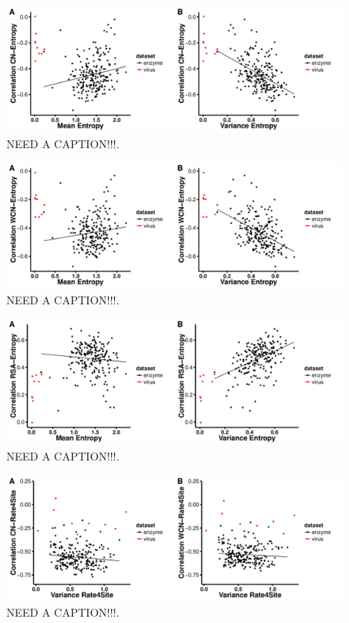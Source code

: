 \documentclass[12pt]{article}
\begin{document}
    \begin{figure}[H]
            \centerline{\includegraphics[width=7.5in]{entropy_cn_cor.pdf}}     
            \caption{NEED A CAPTION!!!.}
            \label{fig:seqent_structure_cors}
    \end{figure}


    \begin{figure}[H]
            \centerline{\includegraphics[width=7.5in]{entropy_wcn_cor.pdf}}     
            \caption{NEED A CAPTION!!!.}
            \label{fig:seqent_structure_cors}
    \end{figure}


    \begin{figure}[H]
            \centerline{\includegraphics[width=7.5in]{entropy_rsa_cor.pdf}}     
            \caption{NEED A CAPTION!!!.}
            \label{fig:seqent_structure_cors}
    \end{figure}
  
       
        \begin{figure}[H]
            \centerline{\includegraphics[width=7.5in]{rate_cor.pdf}}     
            \caption{NEED A CAPTION!!!.}
            \label{fig:seqent_structure_cors}
    \end{figure}
        
\end{document}
